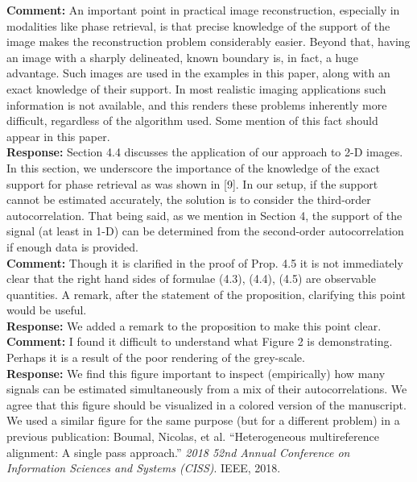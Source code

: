 \documentclass[12pt]{article}
\newcommand{\1}{\mathbf{1}}
\theoremstyle{plain}
\theoremstyle{definition}
\theoremstyle{remark}
\theoremstyle{plain}
\theoremstyle{remark}
\theoremstyle{plain}
\theoremstyle{plain}
\theoremstyle{plain}
\numberwithin{equation}{section}
\begin{document}
\noindent \textbf{Comment:} An important point in practical image reconstruction, especially in modalities like phase retrieval, is that precise knowledge of the support of the image makes the reconstruction problem considerably easier.  Beyond that, having an image with a sharply delineated, known boundary is, in fact, a huge advantage. Such images are used in the examples in this paper, along with an exact knowledge of their support.  In most realistic imaging applications such information is not available, and this renders these problems inherently more difficult, regardless of the algorithm used. Some mention of this fact should appear in this paper.\\

\noindent \textbf{Response:} Section 4.4 discusses the application of our approach to 2-D images. In this section, we underscore the importance of the knowledge of the exact support for phase retrieval as was shown in [9]. In our setup, if the support cannot be estimated accurately, the solution is to consider the third-order autocorrelation. That being said, as we mention in Section 4, the support of the signal (at least in 1-D) can be determined from the second-order autocorrelation if enough data is provided. \\

\noindent \textbf{Comment:} Though it is clarified in the proof of Prop. 4.5 it is not immediately clear that  the right hand sides of formulae (4.3), (4.4), (4.5) are observable quantities. A remark, after the statement of the proposition, clarifying this  point would be useful.\\

\noindent \textbf{Response:} We added a remark to the proposition to make this point clear.\\

\noindent \textbf{Comment:}  I found it difficult to understand what Figure 2 is demonstrating. Perhaps it is a result of the poor rendering of the grey-scale.
\\ 

\noindent \textbf{Response:} We find this figure important to inspect (empirically) how many signals can be estimated simultaneously from a mix of their autocorrelations. We agree that this figure should be visualized in a colored version of the manuscript. We used a similar figure for the same purpose (but for a different problem) in a previous publication: Boumal, Nicolas, et al. ``Heterogeneous multireference alignment: A single pass approach.'' \emph{2018 52nd Annual Conference on Information Sciences and Systems (CISS)}. IEEE, 2018.
\end{document}
